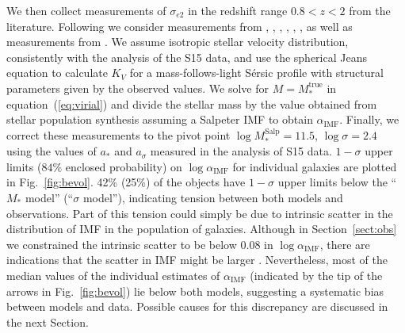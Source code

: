 \documentclass[usenatbib]{mnras}
\def\mtrue{M_*^{\mathrm{true}}}
\def\msalp{M_*^{\mathrm{Salp}}}
\def\aimf{\alpha_{\mathrm{IMF}}}
\def\Sref#1{Section~\ref{#1}\xspace}
\def\Fref#1{Fig.~\ref{#1}\xspace}
\def\Eref#1{equation~(\ref{#1})\xspace}
\begin{document}
We then collect measurements of $\sigma_{e2}$ in the redshift range
$0.8 < z < 2$ from the literature. Following \citet{Mas++15} we
consider measurements from \citet{vdW++08}, \citet{Cap++09},
\citet{New++10}, \citet{Ono++12}, \citet{Bez++13}, \citet{vdS++13}, as
well as measurements from \citet{Gar++15}.  We assume isotropic
  stellar velocity distribution, consistently with the analysis of the
  S15 data, and use the spherical Jeans equation to calculate $K_V$
  for a mass-follows-light S\'{e}rsic \citep{Ser68} profile with structural parameters
  given by the observed values. We
solve for $M=\mtrue$ in \Eref{eq:virial} and divide the stellar mass
by the value obtained from stellar population synthesis assuming a
Salpeter IMF to obtain $\aimf$.  Finally, we correct these
measurements to the pivot point $\log{\msalp}=11.5$,
$\log{\sigma}=2.4$ using the values of $a_*$ and $a_\sigma$ measured
in the analysis of S15 data.  $1-\sigma$ upper limits ($84\%$ enclosed
probability) on $\log{\aimf}$ for individual galaxies are plotted in
\Fref{fig:bevol}.  42\% (25\%) of the objects have $1-\sigma$ upper
limits below the ``$M_*$ model'' (``$\sigma$ model''), indicating
tension between both models and observations.  Part of this tension
could simply be due to intrinsic scatter in the distribution of IMF in
the population of galaxies.  Although in \Sref{sect:obs} we
constrained the intrinsic scatter to be below $0.08$ in $\log{\aimf}$,
there are indications that the scatter in IMF might be larger 
\citep{S+L13}. Nevertheless, most of the
median values of the individual estimates of $\aimf$ (indicated by the
tip of the arrows in \Fref{fig:bevol}) lie below both models,
suggesting a systematic bias between models and data.  Possible causes
for this discrepancy are discussed in the next Section.
%
\end{document}

